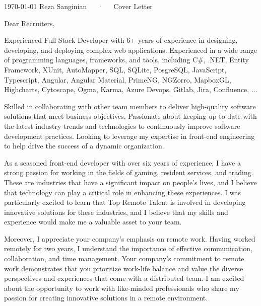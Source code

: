 \documentclass[11pt, a4paper]{awesome-cv}
\begin{document}
\makecvheader[R]

\makecvfooter
  {\today}
  {Reza Sanginian~~~·~~~Cover Letter}
  {}

\makelettertitle
Dear Recruiters,

\begin{cvletter}

Experienced Full Stack Developer with 6+ years of experience in designing, developing, and deploying complex web applications. Experienced in a
wide range of programming languages, frameworks, and tools, including C#, .NET, Entity Framework, XUnit, AutoMapper, SQL, SQLite, PosgreSQL,
JavaScript, Typescript, Angular, Angular Material, PrimeNG, NGZorro, MapboxGL, Highcharts, Cytoscape, Ogma, Karma, Azure Devops, Gitlab, Jira,
Confluence, ...

Skilled in collaborating with other team members to deliver high-quality software solutions that meet business objectives. Passionate about
keeping up-to-date with the latest industry trends and technologies to continuously improve software development practices. Looking to leverage
my expertise in front-end engineering to help drive the success of a dynamic organization.

As a seasoned front-end developer with over six years of experience, I have a strong passion for working in the fields of gaming, resident services, and trading. These are industries that have a significant impact on people's lives, and I believe that technology can play a critical role in enhancing these experiences. I was particularly excited to learn that Top Remote Talent is involved in developing innovative solutions for these industries, and I believe that my skills and experience would make me a valuable asset to your team.

Moreover, I appreciate your company's emphasis on remote work. Having worked remotely for two years, I understand the importance of effective communication, collaboration, and time management. Your company's commitment to remote work demonstrates that you prioritize work-life balance and value the diverse perspectives and experiences that come with a distributed team. I am excited about the opportunity to work with like-minded professionals who share my passion for creating innovative solutions in a remote environment.


\end{cvletter}
\end{document}
